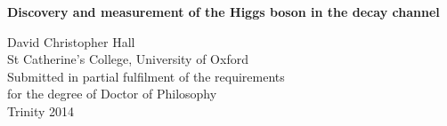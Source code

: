 \documentclass{hepthesis}
\begin{document}
	\thispagestyle{empty}

	\begin{center}
		\begin{spacing}{1.2}%
			\Huge\textbf{Discovery and measurement of the Higgs boson in the \WW decay channel}\\%
		\end{spacing}%
		\vspace*{1cm}%
		{\Large David Christopher Hall\\%
		\vspace*{0.3cm}%
		St Catherine's College, University of Oxford}\\%
		\vspace*{1cm}%
		Submitted in partial fulfilment of the requirements\\%
		for the degree of Doctor of Philosophy\\%
		\vspace*{0.2cm}
		Trinity 2014%
	\end{center}

	\vspace*{1cm}%
	\adjustwidth{1cm}{1cm}
	\textrm{}
	\endadjustwidth
\end{document}
